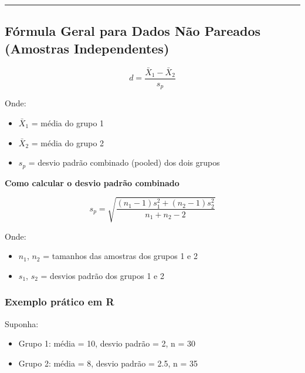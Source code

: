 \documentclass[
]{book}
\providecommand{\tightlist}{%
  \setlength{\itemsep}{0pt}\setlength{\parskip}{0pt}}
\begin{document}
\begin{center}\rule{0.5\linewidth}{0.5pt}\end{center}

\subsection{Fórmula Geral para Dados Não Pareados (Amostras Independentes)}\label{fuxf3rmula-geral-para-dados-nuxe3o-pareados-amostras-independentes}

\[
d = \frac{\bar{X}_1 - \bar{X}_2}{s_p}
\]

Onde:

\begin{itemize}
\tightlist
\item
  \(\bar{X}_1\) = média do grupo 1\\
\item
  \(\bar{X}_2\) = média do grupo 2\\
\item
  \(s_p\) = desvio padrão combinado (pooled) dos dois grupos
\end{itemize}

\textbf{Como calcular o desvio padrão combinado}

\[
s_p = \sqrt{ \frac{(n_1-1)s_1^2 + (n_2-1)s_2^2}{n_1 + n_2 - 2} }
\]

Onde:

\begin{itemize}
\tightlist
\item
  \(n_1\), \(n_2\) = tamanhos das amostras dos grupos 1 e 2\\
\item
  \(s_1\), \(s_2\) = desvios padrão dos grupos 1 e 2
\end{itemize}

\subsubsection{Exemplo prático em R}\label{exemplo-pruxe1tico-em-r}

Suponha:

\begin{itemize}
\tightlist
\item
  Grupo 1: média = 10, desvio padrão = 2, n = 30\\
\item
  Grupo 2: média = 8, desvio padrão = 2.5, n = 35
\end{itemize}
\end{document}
